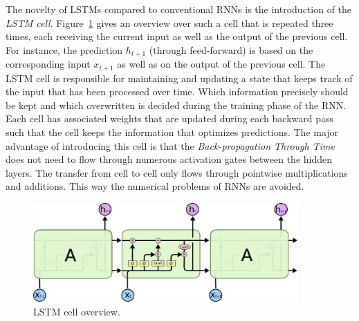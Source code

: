 The novelty of LSTMs compared to conventional RNNs is the introduction of the \textit{LSTM cell}. Figure~\ref{fig:lstm} gives an overview over such a cell that is repeated three times, each receiving the current input as well as the output of the previous cell. For instance, the prediction $h_{t+1}$ (through feed-forward) is based on the corresponding input $x_{t+1}$ as well as on the output of the previous cell. The LSTM cell is responsible for maintaining and updating a state that keeps track of the input that has been processed over time. Which information precisely should be kept and which overwritten is decided during the training phase of the RNN. Each cell has associated weights that are updated during each backward pass such that the cell keeps the information that optimizes predictions. The major advantage of introducing this cell is that the \textit{Back-propagation Through Time} does not need to flow through numerous activation gates between the hidden layers. The transfer from cell to cell only flows through pointwise multiplications and additions. This way the numerical problems of RNNs are avoided.

\begin{figure}
\centering
\includegraphics[width=0.9\textwidth]{img/lstm}
\caption{LSTM cell overview.\protect\footnotemark}
\label{fig:lstm}
\end{figure}

